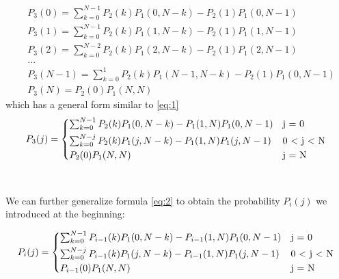 \begin{align*}
	&P_{3}(0) = \sum_{k=0}^{N-1}P_{2}(k)P_{1}(0, N - k) - P_{2}(1)P_{1}(0, N-1)\\
	&P_{3}(1) = \sum_{k=0}^{N-1}P_{2}(k)P_{1}(1, N - k) - P_{2}(1)P_{1}(1, N-1)\\
	&P_{3}(2) = \sum_{k=0}^{N-2}P_{2}(k)P_{1}(2, N - k) - P_{2}(1)P_{1}(2, N-1)\\
	&...\\
	&P_{3}(N-1) = \sum_{k=0}^{1}P_{2}(k)P_{1}(N-1, N - k) - P_{2}(1)P_{1}(0, N-1)\\
	&P_{3}(N) = P_{2}(0)P_{1}(N, N)
\end{align*}
which has a general form similar to \eqref{eq:1}
  \begin{equation}
  \label{eq:2}
    P_{3}(j) =
    \begin{cases*}
      \sum_{k=0}^{N-1}P_{2}(k)P_{1}(0, N - k) - P_{1}(1, N)P_{1}(0, N-1) & j = 0 \\
      \sum_{k=0}^{N-j}P_{2}(k)P_{1}(j, N - k) - P_{1}(1, N)P_{1}(j, N-1) & 0 $<$ j $<$ N \\
      P_{2}(0)P_{1}(N, N) & j = N \\
    \end{cases*}
  \end{equation}
\\
\\

We can further generalize formula \ref{eq:2} to obtain the probability $P_{i}(j)$ we introduced at the beginning:

  \begin{equation}
  \label{eq:3}
    P_{i}(j) =
    \begin{cases*}
      \sum_{k=0}^{N-1}P_{i-1}(k)P_{1}(0, N - k) - P_{i-1}(1, N)P_{1}(0, N-1) & j = 0 \\
      \sum_{k=0}^{N-j}P_{i-1}(k)P_{1}(j, N - k) - P_{i-1}(1, N)P_{1}(j, N-1) & 0 $<$ j $<$ N \\
      P_{i-1}(0)P_{1}(N, N) & j = N \\
    \end{cases*}
  \end{equation}
\\
\\